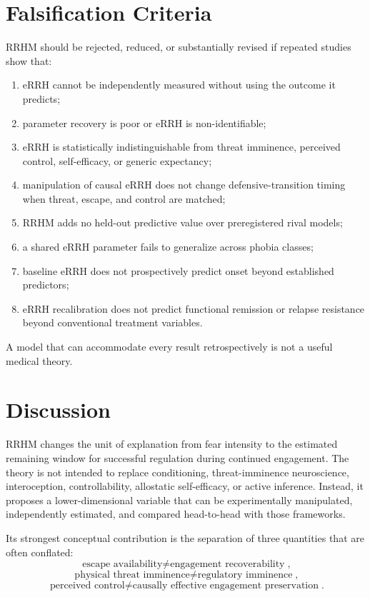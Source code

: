 \documentclass[11pt]{article}
\begin{document}
\section{Falsification Criteria}
RRHM should be rejected, reduced, or substantially revised if repeated studies show that:
\begin{enumerate}[leftmargin=2em]
\item eRRH cannot be independently measured without using the outcome it predicts;
\item parameter recovery is poor or eRRH is non-identifiable;
\item eRRH is statistically indistinguishable from threat imminence, perceived control, self-efficacy, or generic expectancy;
\item manipulation of causal eRRH does not change defensive-transition timing when threat, escape, and control are matched;
\item RRHM adds no held-out predictive value over preregistered rival models;
\item a shared eRRH parameter fails to generalize across phobia classes;
\item baseline eRRH does not prospectively predict onset beyond established predictors;
\item eRRH recalibration does not predict functional remission or relapse resistance beyond conventional treatment variables.
\end{enumerate}

A model that can accommodate every result retrospectively is not a useful medical theory.

\section{Discussion}
RRHM changes the unit of explanation from fear intensity to the estimated remaining window for successful regulation during continued engagement. The theory is not intended to replace conditioning, threat-imminence neuroscience, interoception, controllability, allostatic self-efficacy, or active inference. Instead, it proposes a lower-dimensional variable that can be experimentally manipulated, independently estimated, and compared head-to-head with those frameworks.

Its strongest conceptual contribution is the separation of three quantities that are often conflated:
\[
\boxed{\text{escape availability}\neq\text{engagement recoverability}},
\]
\[
\boxed{\text{physical threat imminence}\neq\text{regulatory imminence}},
\]
\[
\boxed{\text{perceived control}\neq\text{causally effective engagement preservation}}.
\]
\end{document}
